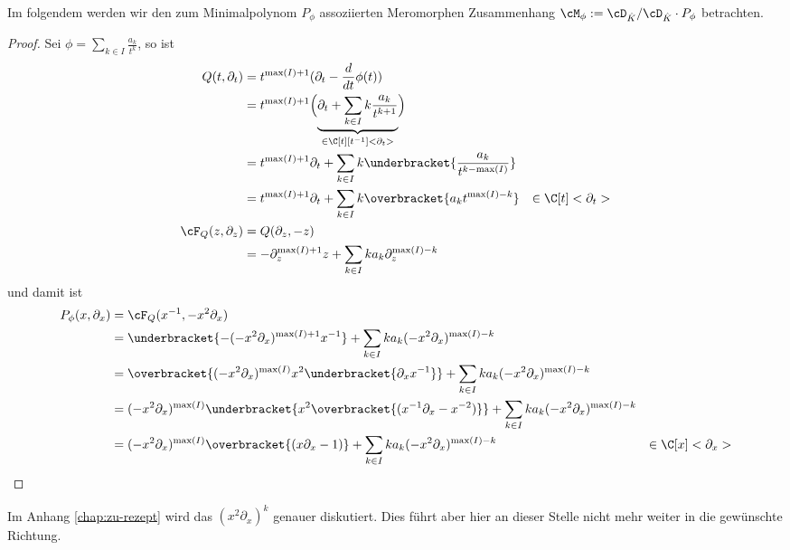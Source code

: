 Im folgendem werden wir den zum Minimalpolynom $P_\phi$ assoziierten
Meromorphen Zusammenhang $\cM_\phi:=\cD_{\hat K}/\cD_{\hat K}\cdot P_{\phi}$
betrachten.

\begin{lem}
Zu einem $\phi=\sum_{k\in I}\frac{a_k}{t^{k}}\in {\phi=\sum_{k\in
I}\frac{a_k}{t^{k}}|I\subset\N\mbox{ endlich} ,a_k\in \C\}$ ist das
Minimalpolynom von $\cM_\phi$ explizit gegeben durch
\begin{align*}
P_{\phi}(x,\partial_x) &=(-x^2\partial_x)^{\max(I)} (x\partial_x-1)
   +\sum_{k\in I}k a_k(-x^2\partial_x)^{\max(I)-k} & \in \C[x]<\partial_x>
\end{align*}
\end{lem}
\begin{proof}
Sei $\phi=\sum_{k\in I}\frac{a_k}{t^{k}}$, so ist
\begin{align*}
Q(t,\partial_t) &= t^{\max(I)+1}(\partial_t-\frac{d}{dt}\phi(t))
\\&=t^{\max(I)+1}\Big(\underset{\in \C[t][t^{-1}]<\partial_t>}{\underbrace{
    \partial_t+\sum_{k\in I} k\frac{a_k}{t^{k+1}}}}\Big)
\\&=t^{\max(I)+1}\partial_t
  + \sum_{k\in I} k\underbracket{\frac{a_k}{t^{k-\max(I)}}}
\\&=t^{\max(I)+1}\partial_t +\sum_{k\in I}k \overbracket{a_k t^{\max(I)-k}}
  & \in \C[t]<\partial_t>
\\\cF_Q(z,\partial_z) &=Q(\partial_z,-z)
\\&=-\partial_z^{\max(I)+1}z +\sum_{k\in I}k a_k\partial_z^{\max(I)-k}
\end{align*}
und damit ist
\begin{align*}
P_{\phi}(x,\partial_x) &=\cF_Q(x^{-1},-x^2\partial_x)
\\&=\underbracket{-(-x^2\partial_x)^{\max(I)+1}x^{-1}}
  +\sum_{k\in I}k a_k(-x^2\partial_x)^{\max(I)-k}
\\&=\overbracket{(-x^2\partial_x)^{\max(I)} x^2\underbracket{\partial_xx^{-1}}}
   +\sum_{k\in I}k a_k(-x^2\partial_x)^{\max(I)-k}
\\&=(-x^2\partial_x)^{\max(I)}
   \underbracket{ x^2 \overbracket{(x^{-1}\partial_x-x^{-2})} }
   +\sum_{k\in I}k a_k(-x^2\partial_x)^{\max(I)-k}
\\&=(-x^2\partial_x)^{\max(I)} \overbracket{(x\partial_x-1)}
   +\sum_{k\in I}k a_k(-x^2\partial_x)^{\max(I)-k}
  & \in \C[x]<\partial_x>
\end{align*}
\end{proof}
Im Anhang \ref{chap:zu-rezept} wird das $(x^2\partial_x)^{k}$ genauer
diskutiert. Dies führt aber hier an dieser Stelle nicht mehr weiter in die
gewünschte Richtung.

